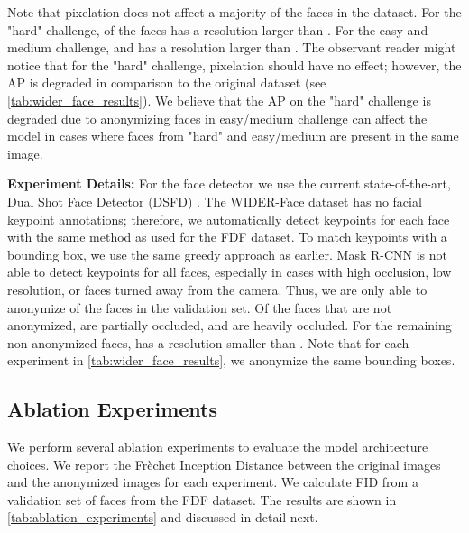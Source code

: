 \documentclass[runningheads]{llncs}
\begin{document}
Note that  pixelation does not affect a majority of the faces in the dataset. 
For the "hard" challenge,  of the faces has a resolution larger than .
For the easy and medium challenge,  and  has a resolution larger than .
The observant reader might notice that for the "hard" challenge,  pixelation should have no effect; however, the AP is degraded in comparison to the original dataset (see \autoref{tab:wider_face_results}).
We believe that the AP on the "hard" challenge is degraded due to anonymizing faces in easy/medium challenge can affect the model in cases where faces from "hard" and easy/medium are present in the same image.



\textbf{Experiment Details:} For the face detector we use the current state-of-the-art, Dual Shot Face Detector (DSFD) \cite{li2018dsfd}.
The WIDER-Face dataset has no facial keypoint annotations; therefore,
we automatically detect keypoints for each face with the same method as used for the FDF dataset.
To match keypoints with a bounding box, we use the same greedy approach as earlier. 
Mask R-CNN \cite{He2017} is not able to detect keypoints for all faces, especially in cases with high occlusion, low resolution, or faces turned away from the camera.
Thus, we are only able to anonymize  of the faces in the validation set.
Of the faces that are not anonymized,  are partially occluded, and  are heavily occluded. For the remaining non-anonymized faces,  has a resolution smaller than . Note that for each experiment in \autoref{tab:wider_face_results}, we anonymize the same bounding boxes.


\subsection{Ablation Experiments}


We perform several ablation experiments to evaluate the model architecture choices. We report the Fr\`echet Inception Distance \cite{heusel2017gans} between the original images and the anonymized images for each experiment. 
We calculate FID from a validation set of  faces from the FDF dataset.
The results are shown in \autoref{tab:ablation_experiments} and discussed in detail next.
\end{document}
